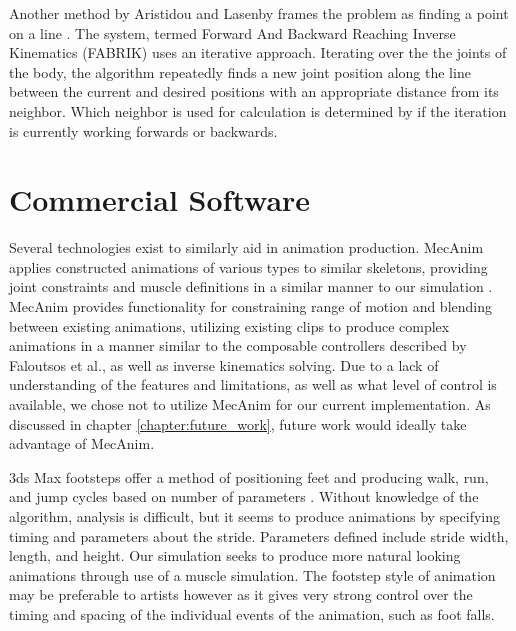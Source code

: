 Another method by Aristidou and Lasenby frames the problem as finding a point on a line \cite{fabrik}.  The system, termed Forward And Backward Reaching Inverse Kinematics (FABRIK) uses an iterative approach.  Iterating over the the joints of the body, the algorithm repeatedly finds a new joint position along the line between the current and desired positions with an appropriate distance from its neighbor.  Which neighbor is used for calculation is determined by if the iteration is currently working forwards or backwards.

\section{Commercial Software}
\label{section:commercial_bg}
Several technologies exist to similarly aid in animation production. \unity{} MecAnim applies constructed animations of various types to similar skeletons, providing joint constraints and muscle definitions in a similar manner to our simulation \cite{unity_mecanim}.  MecAnim provides functionality for constraining range of motion and blending between existing animations, utilizing existing clips to produce complex animations in a manner similar to the composable controllers described by Faloutsos et al., as well as inverse kinematics solving.  Due to a lack of understanding of the features and limitations, as well as what level of control is available, we chose not to utilize MecAnim for our current implementation.  As discussed in chapter \ref{chapter:future_work}, future work would ideally take advantage of MecAnim.

3ds Max footsteps offer a method of positioning feet and producing walk, run, and jump cycles based on  number of parameters \cite{3dsmax}.  Without knowledge of the algorithm, analysis is difficult, but it seems to produce animations by specifying timing and parameters about the stride.  Parameters defined include stride width, length, and height.  Our simulation seeks to produce more natural looking animations through use of a muscle simulation.  The footstep style of animation may be preferable to artists however as it gives very strong control over the timing and spacing of the individual events of the animation, such as foot falls.